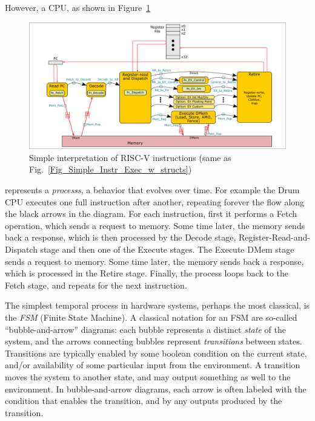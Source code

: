 However, a CPU, as shown in Figure~\ref{Fig_FSMs_Simple_Instr_Exec}
\begin{figure}[htbp]
  \centerline{\includegraphics[width=6in,angle=0]{Figures/Fig_Instr_Exec_w_structs}}
  \caption{\label{Fig_FSMs_Simple_Instr_Exec}
           Simple interpretation of RISC-V instructions
	   (same as Fig.~\ref{Fig_Simple_Instr_Exec_w_structs})}
\end{figure}
represents a \emph{processs}, a behavior that evolves over time.  For
example the Drum CPU executes one full instruction after another,
repeating forever the flow along the black arrows in the diagram. For
each instruction, first it performs a Fetch operation, which sends a
request to memory. Some time later, the memory sends back a response,
which is then processed by the Decode stage,
Register-Read-and-Dispatch stage and then one of the Execute stages.
The Execute DMem stage sends a request to memory. Some time later, the
memory sends back a response, which is processed in the Retire stage.
Finally, the process loops back to the Fetch stage, and repeats for
the next instruction.

The simplest temporal process in hardware systems, perhaps the most
classical, is the \emph{FSM} (Finite State Machine).  A classical
notation for an FSM are so-called ``bubble-and-arrow'' diagrams: each
bubble represents a distinct \emph{state} of the system, and the
arrows connecting bubbles represent \emph{transitions} between states.
Transitions are typically enabled by some boolean condition on the
current state, and/or availability of some particular input from the
environment.  A transition moves the system to another state, and may
output something as well to the environment.  In bubble-and-arrow
diagrams, each arrow is often labeled with the condition that enables
the transition, and by any outputs produced by the transition.



